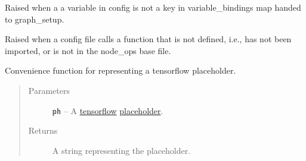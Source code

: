 \documentclass[letterpaper,10pt,english]{sphinxmanual}
\begin{document}
\begin{fulllineitems}
\label{config:config.UndefinedVariableError}
Raised when a a variable in config is not a key in variable\_bindings map handed to graph\_setup.

\end{fulllineitems}


\begin{fulllineitems}
\label{config:config.UnsupportedNodeError}
Raised when a config file calls a function that is not defined, i.e., has not been imported, or is not in the
node\_ops base file.

\end{fulllineitems}


\begin{fulllineitems}
\label{config:config.ph_rep}
Convenience function for representing a tensorflow placeholder.
\begin{quote}\begin{description}
\item[{Parameters}] \leavevmode
\textbf{\texttt{ph}} -- A \href{https://www.tensorflow.org/}{tensorflow} \href{https://www.tensorflow.org/versions/r0.7/api\_docs/python/io\_ops.html\#placeholders}{placeholder}.

\item[{Returns}] \leavevmode
A string representing the placeholder.

\end{description}\end{quote}

\end{fulllineitems}

\end{document}
